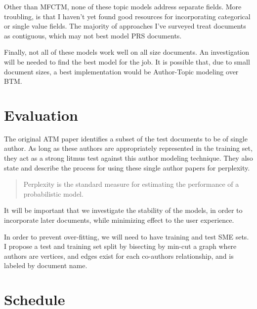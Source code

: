 \documentclass{article}
\begin{document}
\begin{multicols}{2}
Other than MFCTM\cite{Salomatin2009MultifieldCT}, none of these topic models
address separate fields. More troubling, is that I haven't yet found good resources for
incorporating categorical or single value fields. The majority of approaches I've surveyed
treat documents as contiguous, which may not best model PRS documents.

Finally, not all of these models work well on all size documents. An investigation will
be needed to find the best model for the job. It is possible that, due to small document
sizes, a best implementation would be Author-Topic modeling over BTM.


\section{Evaluation}

The original ATM paper identifies a subset of the test documents to be of single author.
As long as these authors are appropriately represented in the training set, they act as
a strong litmus test against this author modeling technique. They also state and describe
the process for using these single author papers for perplexity.
\begin{quote}
  Perplexity is the standard measure for estimating the performance of a probabilistic model.
\end{quote}

It will be important that we investigate the stability of the models\cite{Yang2016}, in order
to incorporate later documents, while minimizing effect to the user experience.

In order to prevent over-fitting, we will need to have training and test SME sets.
I propose a test and training set split by bisecting by min-cut\cite{Feige2002} a graph where
authors are vertices, and edges exist for each co-authors relationship, and is labeled by
document name.

\section{Schedule}


\end{multicols}
\end{document}
